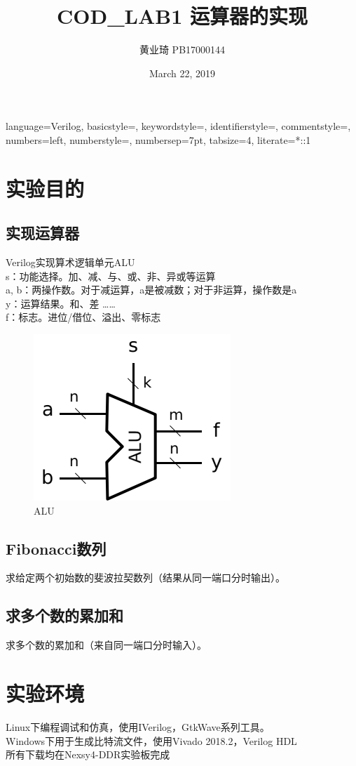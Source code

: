 \documentclass[12pt, a4paper]{article}
\title{COD\_LAB1 运算器的实现}
\author{黄业琦 PB17000144}
\date{March 22, 2019}
\begin{document}
\maketitle
{}
{
	language=Verilog,
	basicstyle=\small\ttfamily,
	keywordstyle=\color{vblue},
	identifierstyle=\color{black},
	commentstyle=\color{vgreen},
	numbers=left,
	numberstyle=\tiny\color{black},
	numbersep=7pt,
	tabsize=4,
	literate=*{:}{{\textcolor{black}{:}}}1
}
\section{实验目的}
\subsection{实现运算器}
Verilog实现算术逻辑单元ALU\\
s：功能选择。加、减、与、或、非、异或等运算\\
a, b：两操作数。对于减运算，a是被减数；对于非运算，操作数是a\\
y：运算结果。和、差 …… \\
f：标志。进位/借位、溢出、零标志\\
\begin{figure}[H]
	\centering
	\includegraphics[width=0.4\linewidth]{ALUpic}
	\caption{ALU}
	\label{fig:alupic}
\end{figure}
\subsection{Fibonacci数列}
求给定两个初始数的斐波拉契数列（结果从同一端口分时输出）。
\subsection{求多个数的累加和}
求多个数的累加和（来自同一端口分时输入）。


\section{实验环境}
Linux下编程调试和仿真，使用IVerilog，GtkWave系列工具。\\
Windows下用于生成比特流文件，使用Vivado 2018.2，Verilog HDL\\
所有下载均在Nexsy4-DDR实验板完成
\end{document}
